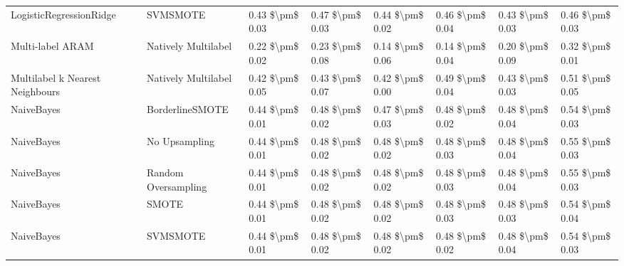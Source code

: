 \begin{tabular}{llllllll}
        LogisticRegressionRidge &                      SVMSMOTE & 0.43 \$\textbackslash pm\$ 0.03 &           0.47 \$\textbackslash pm\$ 0.03 &       0.44 \$\textbackslash pm\$ 0.02 &        0.46 \$\textbackslash pm\$ 0.04 &                         0.43 \$\textbackslash pm\$ 0.03 &     0.46 \$\textbackslash pm\$ 0.03 \\
               Multi-label ARAM &           Natively Multilabel & 0.22 \$\textbackslash pm\$ 0.02 &           0.23 \$\textbackslash pm\$ 0.08 &       0.14 \$\textbackslash pm\$ 0.06 &        0.14 \$\textbackslash pm\$ 0.04 &                         0.20 \$\textbackslash pm\$ 0.09 &     0.32 \$\textbackslash pm\$ 0.01 \\
Multilabel k Nearest Neighbours &           Natively Multilabel & 0.42 \$\textbackslash pm\$ 0.05 &           0.43 \$\textbackslash pm\$ 0.07 &       0.42 \$\textbackslash pm\$ 0.00 &        0.49 \$\textbackslash pm\$ 0.04 &                         0.43 \$\textbackslash pm\$ 0.03 &     0.51 \$\textbackslash pm\$ 0.05 \\
                     NaiveBayes &               BorderlineSMOTE & 0.44 \$\textbackslash pm\$ 0.01 &           0.48 \$\textbackslash pm\$ 0.02 &       0.47 \$\textbackslash pm\$ 0.03 &        0.48 \$\textbackslash pm\$ 0.02 &                         0.48 \$\textbackslash pm\$ 0.04 &     0.54 \$\textbackslash pm\$ 0.03 \\
                     NaiveBayes &                 No Upsampling & 0.44 \$\textbackslash pm\$ 0.01 &           0.48 \$\textbackslash pm\$ 0.02 &       0.48 \$\textbackslash pm\$ 0.02 &        0.48 \$\textbackslash pm\$ 0.03 &                         0.48 \$\textbackslash pm\$ 0.04 &     0.55 \$\textbackslash pm\$ 0.03 \\
                     NaiveBayes &           Random Oversampling & 0.44 \$\textbackslash pm\$ 0.01 &           0.48 \$\textbackslash pm\$ 0.02 &       0.48 \$\textbackslash pm\$ 0.02 &        0.48 \$\textbackslash pm\$ 0.03 &                         0.48 \$\textbackslash pm\$ 0.04 &     0.55 \$\textbackslash pm\$ 0.03 \\
                     NaiveBayes &                         SMOTE & 0.44 \$\textbackslash pm\$ 0.01 &           0.48 \$\textbackslash pm\$ 0.02 &       0.48 \$\textbackslash pm\$ 0.02 &        0.48 \$\textbackslash pm\$ 0.03 &                         0.48 \$\textbackslash pm\$ 0.03 &     0.54 \$\textbackslash pm\$ 0.04 \\
                     NaiveBayes &                      SVMSMOTE & 0.44 \$\textbackslash pm\$ 0.01 &           0.48 \$\textbackslash pm\$ 0.02 &       0.48 \$\textbackslash pm\$ 0.02 &        0.48 \$\textbackslash pm\$ 0.02 &                         0.48 \$\textbackslash pm\$ 0.04 &     0.54 \$\textbackslash pm\$ 0.03 \\

\end{tabular}
